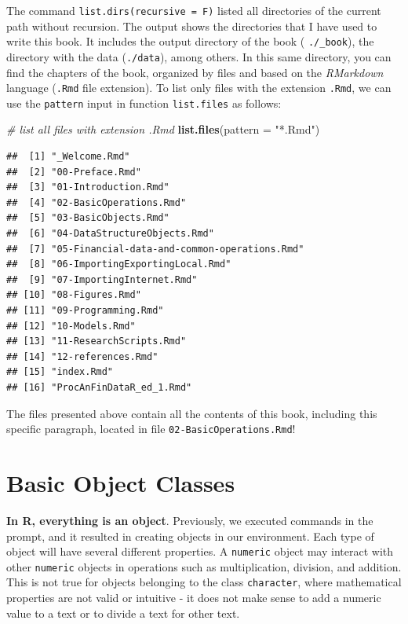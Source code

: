 \documentclass[11pt,]{book}
\newenvironment{Shaded}{\begin{snugshade}}{\end{snugshade}}
\newcommand{\KeywordTok}[1]{\textcolor[rgb]{0.27,0.27,0.27}{\textbf{#1}}}
\newcommand{\DataTypeTok}[1]{\textcolor[rgb]{0.27,0.27,0.27}{#1}}
\newcommand{\StringTok}[1]{\textcolor[rgb]{0.5,0.5,0.5}{#1}}
\newcommand{\CommentTok}[1]{\textcolor[rgb]{0.56,0.35,0.01}{\textit{#1}}}
\newcommand{\NormalTok}[1]{#1}
\begin{document}
The command \texttt{list.dirs(recursive\ =\ F)} listed all directories
of the current path without recursion. The output shows the directories
that I have used to write this book. It includes the output directory of
the book ( \texttt{./\_book}), the directory with the data
(\texttt{./data}), among others. In this same directory, you can find
the chapters of the book, organized by files and based on the
\emph{RMarkdown} language (\texttt{.Rmd} file extension). To list only
files with the extension \texttt{.Rmd}, we can use the \texttt{pattern}
input in function \texttt{list.files} as follows:

\begin{Shaded}
\begin{Highlighting}[]
\CommentTok{# list all files with extension .Rmd}
\KeywordTok{list.files}\NormalTok{(}\DataTypeTok{pattern =} \StringTok{"*.Rmd"}\NormalTok{)}
\end{Highlighting}
\end{Shaded}

\begin{verbatim}
##  [1] "_Welcome.Rmd"                               
##  [2] "00-Preface.Rmd"                             
##  [3] "01-Introduction.Rmd"                        
##  [4] "02-BasicOperations.Rmd"                     
##  [5] "03-BasicObjects.Rmd"                        
##  [6] "04-DataStructureObjects.Rmd"                
##  [7] "05-Financial-data-and-common-operations.Rmd"
##  [8] "06-ImportingExportingLocal.Rmd"             
##  [9] "07-ImportingInternet.Rmd"                   
## [10] "08-Figures.Rmd"                             
## [11] "09-Programming.Rmd"                         
## [12] "10-Models.Rmd"                              
## [13] "11-ResearchScripts.Rmd"                     
## [14] "12-references.Rmd"                          
## [15] "index.Rmd"                                  
## [16] "ProcAnFinDataR_ed_1.Rmd"
\end{verbatim}

The files presented above contain all the contents of this book,
including this specific paragraph, located in file
\texttt{02-BasicOperations.Rmd}!

\hypertarget{BasicObjects}{\chapter{Basic Object
Classes}\label{BasicObjects}}

\textbf{In R, everything is an object}. Previously, we executed commands
in the prompt, and it resulted in creating objects in our environment.
Each type of object will have several different properties. A
\texttt{numeric} object may interact with other \texttt{numeric} objects
in operations such as multiplication, division, and addition. This is
not true for objects belonging to the class \texttt{character}, where
mathematical properties are not valid or intuitive - it does not make
sense to add a numeric value to a text or to divide a text for other
text.
\end{document}
